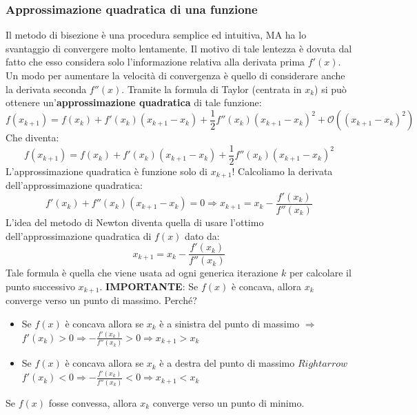 \documentclass[12pt]{article}
\begin{document}
\subsubsection{Approssimazione quadratica di una funzione}
Il metodo di bisezione è una procedura semplice ed intuitiva, MA ha lo svantaggio di convergere molto lentamente.
Il motivo di tale lentezza è dovuta dal fatto che esso considera solo l'informazione relativa alla derivata prima $f'(x)$.
Un modo per aumentare la velocità di convergenza è quello di considerare anche la derivata seconda $f''(x)$.
Tramite la formula di Taylor (centrata in $x_k$) si può ottenere un'\textbf{approssimazione quadratica} di tale funzione:
$$f(x_{k+1}) = f(x_k) + f'(x_k)(x_{k+1}-x_k) + \frac{1}{2}f''(x_k)(x_{k+1}-x_k)^2 + \mathcal{O}((x_{k+1} - x_k)^2)$$
Che diventa:
$$f(x_{k+1}) = f(x_k) + f'(x_k)(x_{k+1}-x_k) + \frac{1}{2}f''(x_k)(x_{k+1}-x_k)^2$$
L'approssimazione quadratica è funzione solo di $x_{k+1}$! Calcoliamo la derivata dell'approssimazione quadratica:
$$f'(x_k) + f''(x_k)(x_{k+1}-x_k) = 0 \Rightarrow x_{k+1} = x_k - \frac{f'(x_k)}{f''(x_k)}$$
L'idea del metodo di Newton diventa quella di usare l'ottimo dell'approssimazione quadratica di $f(x)$ dato da:
$$x_{k+1} = x_k - \frac{f'(x_k)}{f''(x_k)}$$
Tale formula è quella che viene usata ad ogni generica iterazione $k$ per calcolare il punto successivo $x_{k+1}$. \newline
\textbf{IMPORTANTE}: Se $f(x)$ è concava, allora $x_k$ converge verso un punto di massimo. Perché?
\begin{itemize}
    \item Se $f(x)$ è concava allora se $x_k$ è a sinistra del punto di massimo $\Rightarrow$ $f'(x_k) > 0 \Rightarrow -\frac{f'(x_k)}{f''(x_k)} > 0 \Rightarrow x_{k+1} > x_k$
    \item Se $f(x)$ è concava allora se $x_k$ è a destra del punto di massimo $Rightarrow$ $f'(x_k) < 0 \Rightarrow - \frac{f'(x_k)}{f''(x_k)} < 0 \Rightarrow x_{k+1} < x_k$
\end{itemize}
Se $f(x)$ fosse convessa, allora $x_k$ converge verso un punto di minimo.
\end{document}
